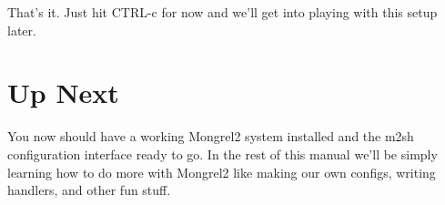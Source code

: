 That's it.  Just hit CTRL-c for now and we'll get into playing with this
setup later.

\section{Up Next}

You now should have a working Mongrel2 system installed and the m2sh configuration
interface ready to go.  In the rest of this manual we'll be simply learning how
to do more with Mongrel2 like making our own configs, writing handlers, and other
fun stuff.

